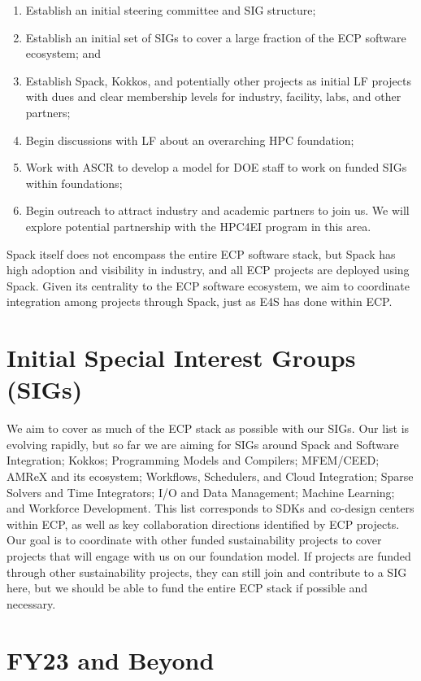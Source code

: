 \documentclass[11pt]{article}
\begin{document}
\begin{enumerate}
\item Establish an initial steering committee and SIG structure;
\item Establish an initial set of SIGs to cover a large fraction of the ECP software
  ecosystem; and
\item Establish Spack, Kokkos, and potentially other projects as initial LF projects with dues and
  clear membership levels for industry, facility, labs, and other partners;
\item Begin discussions with LF about an overarching HPC foundation;
\item Work with ASCR to develop a model for DOE staff to work on funded SIGs within
  foundations;
\item Begin outreach to attract industry and academic partners to join us. We will explore
  potential partnership with the HPC4EI program in this area.
\end{enumerate}

Spack itself does not encompass the entire ECP software stack, but Spack has high
adoption and visibility in industry, and all ECP projects are deployed using Spack.
Given its centrality to the ECP software ecosystem, we aim to coordinate integration
among projects through Spack, just as E4S has done within ECP.

\section{Initial Special Interest Groups (SIGs)}

We aim to cover as much of the ECP stack as possible with our SIGs. Our list
is evolving rapidly, but so far we are aiming for SIGs around Spack and Software
Integration; Kokkos; Programming Models and Compilers; MFEM/CEED; AMReX and its
ecosystem; Workflows, Schedulers, and Cloud Integration; Sparse Solvers and Time
Integrators; I/O and Data Management; Machine Learning; and Workforce Development.
%
This list corresponds to SDKs and co-design centers within ECP, as well as key
collaboration directions identified by ECP projects. Our goal is to coordinate with
other funded sustainability projects to cover projects that will engage with us on
our foundation model. If projects are funded through other sustainability
projects, they can still join and contribute to a SIG here, but we should be able to fund
the entire ECP stack if possible and necessary.

\section{FY23 and Beyond}
\end{document}

